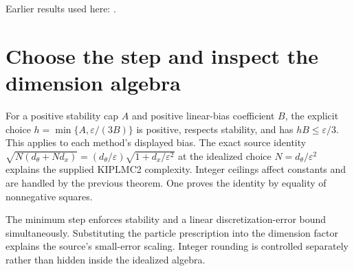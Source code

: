 \documentclass[11pt,a4paper]{article}
\begin{document}
Earlier results used here: \cite[Section~3.98.2]{LangevinLean2026Kinetic}.

\section{\texorpdfstring{Choose the step and inspect the dimension algebra}{Choose the step and inspect the dimension algebra}}


For a positive stability cap \(A\) and positive linear-bias coefficient \(B\), the explicit choice \(h=\min\{A,\varepsilon/(3B)\}\) is positive, respects stability, and has \(hB\le\varepsilon/3\). This applies to each method’s displayed bias. The exact source identity \(\sqrt{N(d_\theta+Nd_x)}=(d_\theta/\varepsilon)\sqrt{1+d_x/\varepsilon^2}\) at the idealized choice \(N=d_\theta/\varepsilon^2\) explains the supplied KIPLMC2 complexity. Integer ceilings affect constants and are handled by the previous theorem. One proves the identity by equality of nonnegative squares.



The minimum step enforces stability and a linear discretization-error bound simultaneously. Substituting the particle prescription into the dimension factor explains the source’s small-error scaling. Integer rounding is controlled separately rather than hidden inside the idealized algebra.
\end{document}
